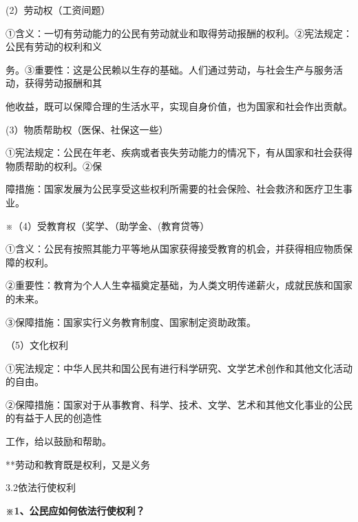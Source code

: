 \documentclass[lang=cn,11pt]{elegantbook}
\newcommand{\daofasym}[1]{{\daofasymbolfont #1}}
\newcommand{\daofasym}[1]{#1}
\begin{document}
(2）劳动权（工资间题）\par

\daofasym{①}含义：一切有劳动能力的公民有劳动就业和取得劳动报酬的权利。\daofasym{②}宪法规定：公民有劳动的权利和义\par

务。\daofasym{③}重要性：这是公民赖以生存的基础。人们通过劳动，与社会生产与服务活动，获得劳动报酬和其\par

他收益，既可以保障合理的生活水平，实现自身价值，也为国家和社会作出贡献。\par

(3）物质帮助权（医保、社保这一些）\par

\daofasym{①}宪法规定：公民在年老、疾病或者丧失劳动能力的情况下，有从国家和社会获得物质帮助的权利。\daofasym{②}保\par

障措施：国家发展为公民享受这些权利所需要的社会保险、社会救济和医疗卫生事业。\par

※（4）受教育权（奖学、（助学金、(教育贷等）\par

\daofasym{①}含义：公民有按照其能力平等地从国家获得接受教育的机会，并获得相应物质保障的权利。\par

\daofasym{②}重要性：教育为个人人生幸福奠定基础，为人类文明传递薪火，成就民族和国家的未来。\par

\daofasym{③}保障措施：国家实行义务教育制度、国家制定资助政策。\par

（5）文化权利\par

\daofasym{①}宪法规定：中华人民共和国公民有进行科学研究、文学艺术创作和其他文化活动的自由。\par

\daofasym{②}保障措施：国家对于从事教育、科学、技术、文学、艺术和其他文化事业的公民的有益于人民的创造性\par

工作，给以鼓励和帮助。\par

**劳动和教育既是权利，又是义务\par

3.2依法行使权利\par

\textbf{※1、公民应如何依法行使权利？}\par
\end{document}
